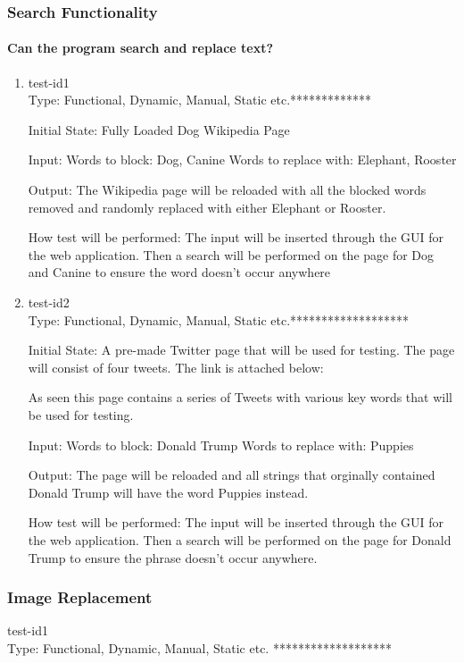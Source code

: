 \documentclass[12pt, titlepage]{article}
\begin{document}
\subsubsection{Search Functionality}
		
\paragraph{Can the program search and replace text?}
\begin{enumerate}
\item{test-id1\\}
Type: Functional, Dynamic, Manual, Static etc.*************
					
Initial State: Fully Loaded Dog Wikipedia Page
					
Input: Words to block: Dog, Canine
Words to replace with: Elephant, Rooster
					
Output: The Wikipedia page will be reloaded with all the blocked words removed and randomly replaced with either Elephant or Rooster.
					
How test will be performed: The input will be inserted through the GUI for the web application. Then a search will be performed on the page for Dog and Canine to ensure the word doesn't occur anywhere
					
\item{test-id2\\}
Type: Functional, Dynamic, Manual, Static etc.*******************
					
Initial State: A pre-made Twitter page that will be used for testing. The page will consist of four tweets. The link is attached below:

As seen this page contains a series of Tweets with various key words that will be used for testing.
					
Input:  Words to block: Donald Trump
Words to replace with: Puppies
					
Output: The page will be reloaded and all strings that orginally contained Donald Trump will have the word Puppies instead. 

How test will be performed: The input will be inserted through the GUI for the web application. Then a search will be performed on the page for Donald Trump to ensure the phrase doesn't occur anywhere.
\end{enumerate}
\subsubsection{Image Replacement}
\item{test-id1\\}
Type: Functional, Dynamic, Manual, Static etc. *******************
					
\end{document}
